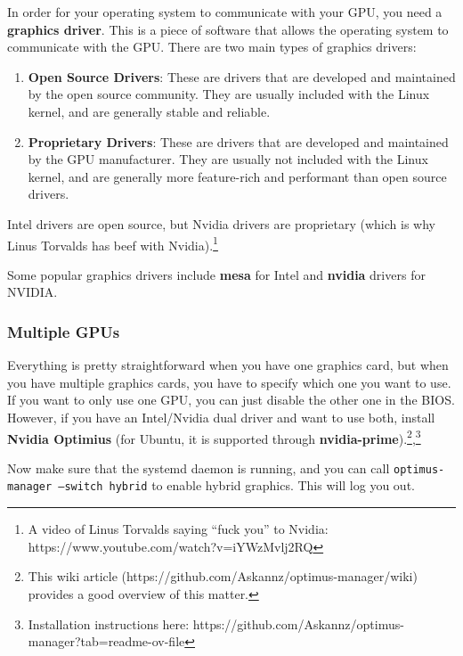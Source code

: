\documentclass{article}
\begin{document}
    \begin{definition}
      In order for your operating system to communicate with your GPU, you need a \textbf{graphics driver}. This is a piece of software that allows the operating system to communicate with the GPU. There are two main types of graphics drivers:
      \begin{enumerate} 
        \item \textbf{Open Source Drivers}: These are drivers that are developed and maintained by the open source community. They are usually included with the Linux kernel, and are generally stable and reliable. 
        \item \textbf{Proprietary Drivers}: These are drivers that are developed and maintained by the GPU manufacturer. They are usually not included with the Linux kernel, and are generally more feature-rich and performant than open source drivers. 
      \end{enumerate}
    Intel drivers are open source, but Nvidia drivers are proprietary (which is why Linus Torvalds has beef with Nvidia).\footnote{A video of Linus Torvalds saying ``fuck you'' to Nvidia: https://www.youtube.com/watch?v=iYWzMvlj2RQ}
    \end{definition}

    Some popular graphics drivers include \textbf{mesa} for Intel and \textbf{nvidia} drivers for NVIDIA. 

    \subsubsection{Multiple GPUs} 

      Everything is pretty straightforward when you have one graphics card, but when you have multiple graphics cards, you have to specify which one you want to use. If you want to only use one GPU, you can just disable the other one in the BIOS. However, if you have an Intel/Nvidia dual driver and want to use both, install \textbf{Nvidia Optimius} (for Ubuntu, it is supported through \textbf{nvidia-prime}).\footnote{This wiki article (https://github.com/Askannz/optimus-manager/wiki) provides a good overview of this matter. },\footnote{Installation instructions here: https://github.com/Askannz/optimus-manager?tab=readme-ov-file} 

      Now make sure that the systemd daemon is running, and you can call \texttt{optimus-manager --switch hybrid} to enable hybrid graphics. This will log you out. 
\end{document}
